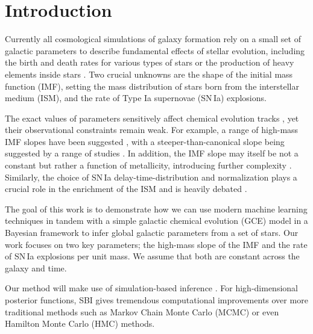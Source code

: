 \documentclass{aa}
\begin{document}
\section{Introduction}

Currently all cosmological simulations of galaxy formation \citep[e.g.][]{Sawala2016,Hopkins2018,Pillepich2018,Buck2020,Buck2020c,Font2020,Agertz2021} rely on a small set of galactic parameters to describe fundamental effects of stellar evolution, including the birth and death rates for various types of stars or the production of heavy elements inside stars \citep[e.g.][]{Buck2021}. Two crucial unknowns are the shape of the initial mass function (IMF), setting the mass distribution of stars born from the interstellar medium (ISM), and the rate of Type Ia supernovae (SN\,Ia) explosions.

The exact values of parameters sensitively affect chemical evolution tracks \citep{2005A&A...430..491R,2015MNRAS.449.1327V,2015MNRAS.451.3693M}, yet their observational constraints remain weak.
%
For example, a range of high-mass IMF slopes have been suggested \citep[Tab.\,7]{2016ApJ...824...82C}, with a steeper-than-canonical slope being suggested by a range of studies \citep[e.g.][]{2015ApJ...806..198W,2015MNRAS.447.3880R,2014ApJ...796...75C}. In addition, the IMF slope may itself be not a constant but rather a function of metallicity, introducing further complexity \citep[e.g.][]{2019MNRAS.482..118G,2019A&A...626A.124M}. Similarly, the choice of SN\,Ia delay-time-distribution and normalization plays a crucial role in the enrichment of the ISM \citep[e.g.][]{Buck2021} and is heavily debated \citep{2010ApJ...722.1879M,2012MNRAS.426.3282M,2015ApJ...810..137J}. 

The goal of this work is to demonstrate how we can use modern machine learning techniques in tandem with a simple galactic chemical evolution (GCE) model in a Bayesian framework to infer global galactic parameters from a set of stars. Our work focuses on two key parameters; the high-mass slope of the \citet[Tab.\,1]{2003PASP..115..763C} IMF and the rate of SN\,Ia explosions per unit mass. We assume that both are constant across the galaxy and time. 

Our method will make use of simulation-based inference \citep[SBI, e.g.][]{Cranmer2020}. For high-dimensional posterior functions, SBI gives tremendous computational improvements over more traditional methods such as Markov Chain Monte Carlo (MCMC) or even Hamilton Monte Carlo (HMC) methods. 
\end{document}
